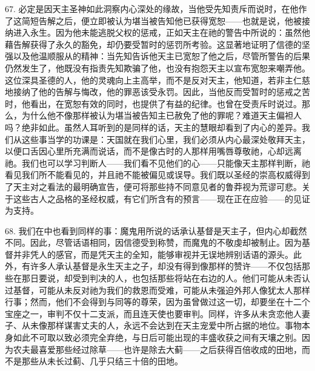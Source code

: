 67. 必定是因天主圣神如此洞察内心深处的缘故，当他受先知责斥而说时，在他作了这简短告解之后，便立即被认为堪当被告知他已获得宽恕——也就是说，他被接纳进入永生。因为他未能逃脱父权的惩戒，正如天主在祂的警告中所说的：虽然他藉告解获得了永久的豁免，却仍要受暂时的惩罚所考验。这显著地证明了信德的坚强以及他温顺服从的精神：当先知告诉他天主已宽恕了他之后，尽管所警告的后果仍然发生了，他既没有指责先知欺骗了他，也没有抱怨天主以宣布宽恕来嘲弄他。这位深具圣德的人，他的灵魂向上主高举，而不是反对天主，他知道，若非主仁慈地接纳了他的告解与悔改，他的罪恶该受永罚。因此，当他反而受暂时的惩戒之苦时，他看出，在宽恕有效的同时，也提供了有益的纪律。也曾在受责斥时说过。那么，为什么他不像那样被认为堪当被告知主已赦免了他的罪呢？难道天主偏袒人吗？绝非如此。虽然人耳听到的是同样的话，天主的慧眼却看到了内心的差异。我们从这些事当学的功课是：天国就在我们心里，我们必须从内心最深处敬拜天主，以便口舌因心里所充满而说话，而不是像古时的人那样用嘴唇尊敬祂，心却远离祂。我们也可以学习判断人——我们看不见他们的心——只能像天主那样判断，祂看见我们所不能看见的，并且祂不能被偏见或误导。我们既以圣经的崇高权威得到了天主对之看法的最明确宣告，便可将那些持不同意见者的鲁莽视为荒谬可悲。关于这些古人之品格的圣经权威，有它们所含有的预言——现在正在应验——的见证为支持。\par

68. 我们在中也看到同样的事：魔鬼用所说的话承认基督是天主子，但内心却截然不同。因此，尽管话语相同，因信德受到称赞，而魔鬼的不敬虔却被制止。因为基督并非凭人的感官，而是凭天主的全知，能够审视并无误地辨别话语的源头。此外，有许多人承认基督是永生天主之子，却没有得到像那样的赞许——不仅包括那些在那日要说，却受到判决的人，也包括那些将站在右边的人。他们可能从未否认过基督，可能从未反对祂为我们的救恩而受难，可能从未强迫外邦人像犹太人那样行事；然而，他们不会得到与同等的尊荣，因为虽曾做过这一切，却要坐在十二个宝座之一，审判不仅十二支派，而且连天使也要审判。同样，许多从未贪恋他人妻子、从未像那样谋害丈夫的人，永远不会达到在天主宠爱中所占据的地位。事物本身如此不可取以致必须完全弃绝，与日后可能出现的丰盛收获之间有天壤之别。因为农夫最喜爱那些经过除草——也许是除去大蓟——之后获得百倍收成的田地，而不是那些从未长过蓟、几乎只结三十倍的田地。\par

